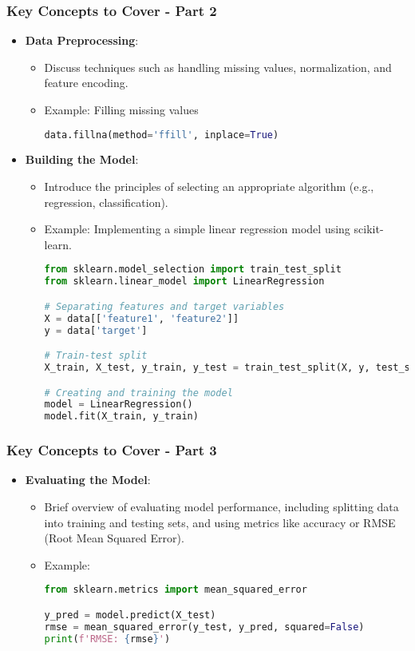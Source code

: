 \documentclass{beamer}
\begin{document}
\begin{frame}[fragile]
    \frametitle{Key Concepts to Cover - Part 2}
    \begin{itemize}
        \item \textbf{Data Preprocessing}:
        \begin{itemize}
            \item Discuss techniques such as handling missing values, normalization, and feature encoding.
            \item Example: Filling missing values
            \begin{lstlisting}[language=python]
data.fillna(method='ffill', inplace=True)
            \end{lstlisting}
        \end{itemize}
        
        \item \textbf{Building the Model}:
        \begin{itemize}
            \item Introduce the principles of selecting an appropriate algorithm (e.g., regression, classification).
            \item Example: Implementing a simple linear regression model using scikit-learn.
            \begin{lstlisting}[language=python]
from sklearn.model_selection import train_test_split
from sklearn.linear_model import LinearRegression

# Separating features and target variables
X = data[['feature1', 'feature2']]
y = data['target']

# Train-test split
X_train, X_test, y_train, y_test = train_test_split(X, y, test_size=0.2, random_state=42)

# Creating and training the model
model = LinearRegression()
model.fit(X_train, y_train)
            \end{lstlisting}
        \end{itemize}
    \end{itemize}
\end{frame}

\begin{frame}[fragile]
    \frametitle{Key Concepts to Cover - Part 3}
    \begin{itemize}
        \item \textbf{Evaluating the Model}:
        \begin{itemize}
            \item Brief overview of evaluating model performance, including splitting data into training and testing sets, and using metrics like accuracy or RMSE (Root Mean Squared Error).
            \item Example:
            \begin{lstlisting}[language=python]
from sklearn.metrics import mean_squared_error

y_pred = model.predict(X_test)
rmse = mean_squared_error(y_test, y_pred, squared=False)
print(f'RMSE: {rmse}')
            \end{lstlisting}
        \end{itemize}
    \end{itemize}
\end{frame}
\end{document}

